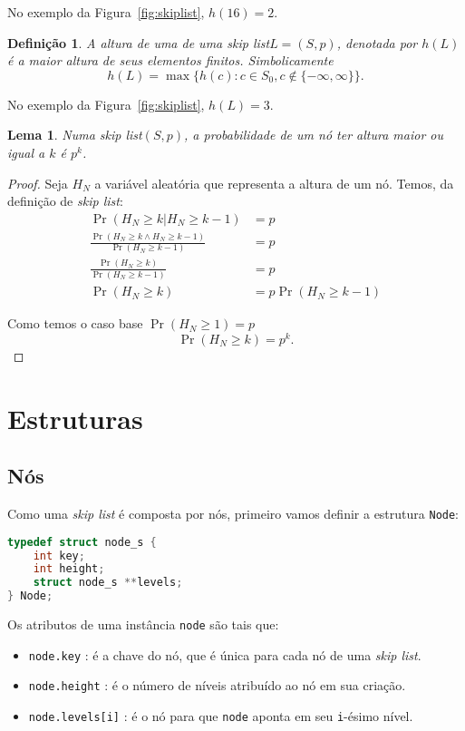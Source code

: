 \documentclass[paper=a4, fontsize=11pt]{scrartcl} %
\newtheorem{definition}{Definição}
\newtheorem{lemma}[theorem]{Lema}
\numberwithin{equation}{section}
\numberwithin{figure}{section}
\numberwithin{table}{section}
\numberwithin{definition}{section}
\numberwithin{theorem}{section}
\numberwithin{property}{section}
\numberwithin{proposition}{section}
\newcommand{\skl}{\textit{skip list}\xspace}
\renewcommand{\sl}{\textit{skip list}\xspace}
\begin{document}
No exemplo da Figura~\ref{fig:skiplist}, $h(16) = 2$.


\begin{definition}

A altura de uma de uma \sl $L = ( S, p )$, denotada por $h(L)$ é a maior altura de seus elementos finitos.
Simbolicamente
$$
h(L) = \max \{ h(c) : c \in S_0, c \notin \{ -\infty, \infty \} \}.
$$

\end{definition}

No exemplo da Figura~\ref{fig:skiplist}, $h(L) = 3$.

\begin{lemma} \label{lemma:prob_of_node_height}
 Numa \sl $(S, p)$, a probabilidade de um nó ter altura maior ou igual a $k$ é $p^k$.

\end{lemma}

\begin{proof}
Seja $H_N$ a variável aleatória que representa a altura de um nó. Temos, da definição de \sl:
\begin{align*}
\Pr(H_N \geq k | H_N \geq k - 1) &= p \\
\frac{\Pr(H_N \geq k \land H_N \geq k - 1)}{\Pr(H_N \geq k - 1)} &= p  \\
\frac{\Pr(H_N \geq k)}{\Pr(H_N \geq k - 1)} &= p  \\
\Pr(H_N \geq k) &= p \Pr(H_N \geq k - 1)
\end{align*}

Como temos o caso base $\Pr(H_N \geq 1) = p$
$$
\Pr(H_N \geq k) = p^k.
$$
\end{proof}
\section{Estruturas} \label{sec:estrut}



\subsection{Nós}

Como uma \skl é composta por nós, primeiro vamos definir a estrutura \verb|Node|:

\begin{lstlisting}[language=C]
typedef struct node_s {
    int key;
    int height;
    struct node_s **levels;
} Node;
\end{lstlisting}

Os atributos de uma instância \verb|node| são tais que:
\begin{itemize}[noitemsep]
  \item \verb|node.key| : é a chave do nó, que é única para cada nó de uma \skl.
  \item \verb|node.height| : é o número de níveis atribuído ao nó em sua criação.
  \item \verb|node.levels[i]| : é o nó para que \verb|node| aponta em seu \verb|i|-ésimo nível.
\end{itemize}
\end{document}

